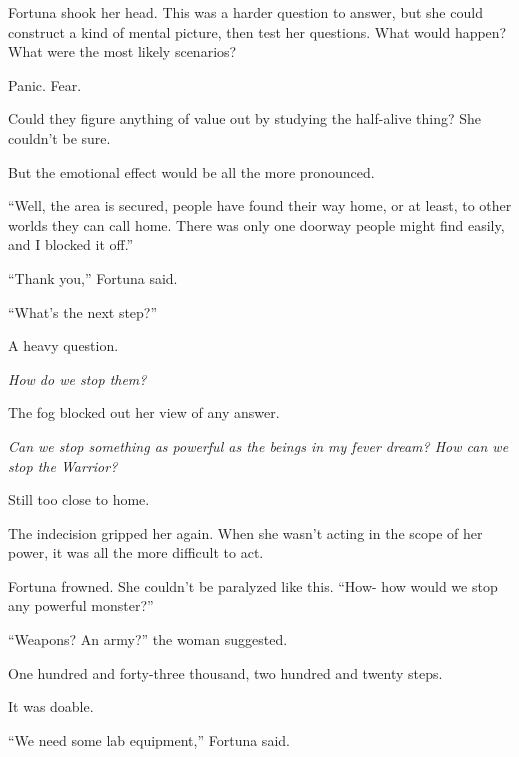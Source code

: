 Fortuna shook her head.  This was a harder question to answer, but she could construct a kind of mental picture, then test her questions.  What would happen?  What were the most likely scenarios?



Panic.  Fear.



Could they figure anything of value out by studying the half-alive thing?  She couldn't be sure.



But the emotional effect would be all the more pronounced.



``Well, the area is secured, people have found their way home, or at least, to other worlds they can call home.  There was only one doorway people might find easily, and I blocked it off.''



``Thank you,'' Fortuna said.



``What's the next step?''



A heavy question.



\emph{How do we stop them?}



The fog blocked out her view of any answer.



\emph{Can we stop something as powerful as the beings in my fever dream?  How can we stop the Warrior?}



Still too close to home.



The indecision gripped her again.  When she wasn't acting in the scope of her power, it was all the more difficult to act.



Fortuna frowned.  She couldn't be paralyzed like this.  ``How- how would we stop any powerful monster?''



``Weapons?  An army?'' the woman suggested.



One hundred and forty-three thousand, two hundred and twenty steps.



It was doable.



``We need some lab equipment,'' Fortuna said.



